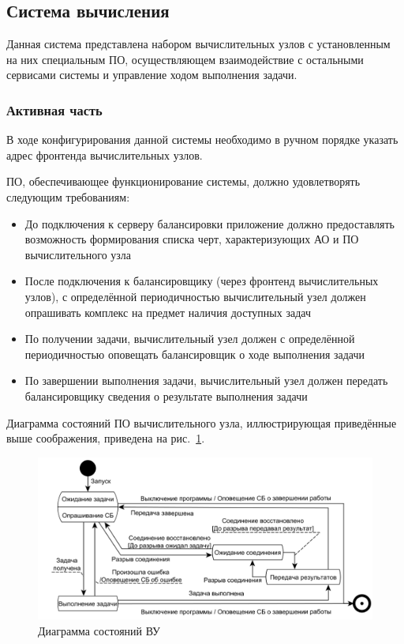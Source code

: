 \documentclass[a4paper,12pt]{report}
\numberwithin{equation}{section}
\begin{document}
  \subsection{Система вычисления}
  Данная система представлена набором вычислительных узлов с установленным на них специальным ПО, 
  осуществляющем взаимодействие с остальными сервисами системы и управление ходом выполнения задачи.
  
  \subsubsection{Активная часть}
  В ходе конфигурирования данной системы необходимо в ручном порядке указать адрес фронтенда вычислительных узлов.
  
  ПО, обеспечивающее функционирование системы, должно удовлетворять следующим требованиям:
  \begin{itemize}
    \item До подключения к серверу балансировки приложение должно предоставлять возможность формирования списка черт, характеризующих АО и ПО вычислительного узла
    \item После подключения к балансировщику (через фронтенд вычислительных узлов), с определённой периодичностью вычислительный узел должен опрашивать комплекс на предмет наличия доступных задач
    \item По получении задачи, вычислительный узел должен с определённой периодичностью оповещать балансировщик о ходе выполнения задачи
    \item По завершении выполнения задачи, вычислительный узел должен передать балансировщику сведения о результате выполнения задачи
  \end{itemize}
  
  Диаграмма состояний ПО вычислительного узла, иллюстрирующая приведённые выше соображения, приведена на рис.~\ref{fig:node-state}.
  
  \begin{figure}
    \centering
    \includegraphics[width=\linewidth]{diagrams/compnode/state}
    \caption{Диаграмма состояний ВУ}
    \label{fig:node-state}
  \end{figure}
  
\end{document}
